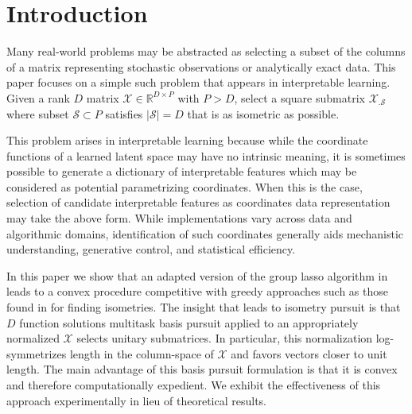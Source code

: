 \section{Introduction}
\label{sec:introduction}

Many real-world problems may be abstracted as selecting a subset of the columns of a matrix representing stochastic observations or analytically exact data.
This paper focuses on a simple such problem that appears in interpretable learning.
Given a rank $D$ matrix $\mathcal X \in \mathbb R^{D \times P}$ with $P > D$, select a square submatrix $\mathcal X_{.\mathcal S}$ where subset $\mathcal S \subset P$ satisfies $|\mathcal S| = D$ that is as isometric as possible.

This problem arises in interpretable learning because while the coordinate functions of a learned latent space may have no intrinsic meaning, it is sometimes possible to generate a dictionary of interpretable features which may be considered as potential parametrizing coordinates.
When this is the case, selection of candidate interpretable features as coordinates data representation may take the above form.
While implementations vary across data and algorithmic domains, identification of such coordinates generally aids mechanistic understanding, generative control, and statistical efficiency.

In this paper we show that an adapted version of the group lasso algorithm in \cite{Koelle2024-no} leads to a convex procedure competitive with greedy approaches such as those found in \cite{NEURIPS2019_6a10bbd4, Kohli2021-lr, Jones2007-uc} for finding isometries.
The insight that leads to isometry pursuit is that $D$ function solutions multitask basis pursuit applied to an appropriately normalized $\mathcal X$ selects unitary submatrices.
In particular, this normalization log-symmetrizes length in the column-space of $\mathcal X$ and favors vectors closer to unit length.
The main advantage of this basis pursuit formulation is that it is convex and therefore computationally expedient.
We exhibit the effectiveness of this approach experimentally in lieu of theoretical results.

